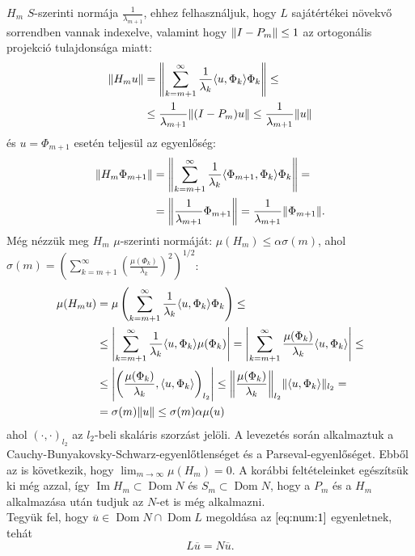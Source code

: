 \documentclass[oneside, titlepage, 12pt, a4paper]{report}
\DeclareMathOperator{\Ima}{Im}	%
\DeclareMathOperator{\Dom}{Dom}	%
\DeclarePairedDelimiter\norm{\lVert}{\rVert}	%
\DeclarePairedDelimiter\abs{\lvert}{\rvert}	%
\begin{document}
$H_m$ $S$-szerinti normája $\frac{1}{\lambda_{m+1}}$, ehhez felhasználjuk, hogy $L$ sajátértékei növekvő sorrendben vannak indexelve, valamint hogy $\norm{I - P_m} \leq 1$ az ortogonális projekció tulajdonsága miatt:
\begin{align*}
\norm{H_m u} &= \norm*{ \sum_{k = m+1}^\infty \frac{1}{\lambda_k} \langle u, \Phi_k \rangle \Phi_k} \leq \\
 &\leq \frac{1}{\lambda_{m+1}} \norm{(I - P_m)u} \leq \frac{1}{\lambda_{m+1}} \norm{u}
\end{align*}
és $u = \Phi_{m+1}$ esetén teljesül az egyenlőség:
\begin{align*}
\norm{H_m \Phi_{m+1}} &= \norm*{ \sum_{k = m+1}^\infty \frac{1}{\lambda_k} \langle \Phi_{m+1}, \Phi_k \rangle \Phi_k} = \\
 &= \norm*{ \frac{1}{\lambda_{m+1}} \Phi_{m+1}} = \frac{1}{\lambda_{m+1}} \norm{\Phi_{m+1}}.
\end{align*}
Még nézzük meg $H_m$ $\mu$-szerinti normáját: $\mu(H_m) \leq \alpha \sigma(m)$, ahol $\sigma(m) = \left(\sum_{k = m+1}^\infty \left( \frac{\mu(\Phi_k)}{\lambda_k}\right)^2\right)^{1/2}$:
\begin{align*}
\mu(H_m u) &= \mu \left( \sum_{k = m+1}^\infty \frac{1}{\lambda_k} \langle u, \Phi_k \rangle \Phi_k \right) \leq \\
 &\leq \abs*{ \sum_{k = m+1}^\infty \frac{1}{\lambda_k} \langle u, \Phi_k \rangle \mu(\Phi_k) } = \abs*{ \sum_{k = m+1}^\infty \frac{\mu(\Phi_k)}{\lambda_k} \langle u, \Phi_k \rangle } \leq \\
 &\leq \abs*{ \left( \frac{\mu(\Phi_k)}{\lambda_k}, \langle u, \Phi_k \rangle \right)_{l_2} } \leq \norm*{\frac{\mu(\Phi_k)}{\lambda_k}}_{l_2} \norm{\langle u, \Phi_k \rangle}_{l_2} = \\
 &= \sigma(m) \norm{u} \leq \sigma(m) \alpha \mu(u)
\end{align*}
ahol $\left( \cdot, \cdot \right)_{l_2}$ az $l_2$-beli skaláris szorzást jelöli. A levezetés során alkalmaztuk a Cauchy-Bunyakovsky-Schwarz-egyenlőtlenséget és a Parseval-egyenlőséget.
Ebből az is következik, hogy $\lim_{m \to \infty} \mu(H_m) = 0$. A korábbi feltételeinket egészítsük ki még azzal, így $\Ima H_m \subset \Dom N$ és $S_m \subset \Dom N$, hogy a $P_m$ és a $H_m$ alkalmazása után tudjuk az $N$-et is még alkalmazni. \\
Tegyük fel, hogy $\overline{u} \in \Dom N \cap \Dom L$ megoldása az $\eqref{eq:num:1}$ egyenletnek, tehát
\begin{equation}
L\overline{u} = N\overline{u}. \label{eq:num:2}
\end{equation}
\end{document}
